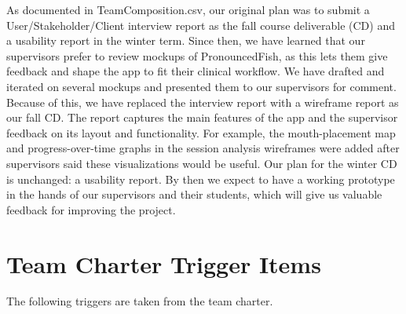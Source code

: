 \documentclass{article}
\begin{document}
As documented in TeamComposition.csv, our original plan was to submit a User/Stakeholder/Client interview report as the fall course deliverable (CD) and a usability report in the winter term. Since then, we have learned that our supervisors prefer to review mockups of PronouncedFish, as this lets them give feedback and shape the app to fit their clinical workflow. We have drafted and iterated on several mockups and presented them to our supervisors for comment. Because of this, we have replaced the interview report with a wireframe report as our fall CD. The report captures the main features of the app and the supervisor feedback on its layout and functionality. For example, the mouth-placement map and progress-over-time graphs in the session analysis wireframes were added after supervisors said these visualizations would be useful. Our plan for the winter CD is unchanged: a usability report. By then we expect to have a working prototype in the hands of our supervisors and their students, which will give us valuable feedback for improving the project.

\section{Team Charter Trigger Items}

The following triggers are taken from the team charter.
\end{document}
